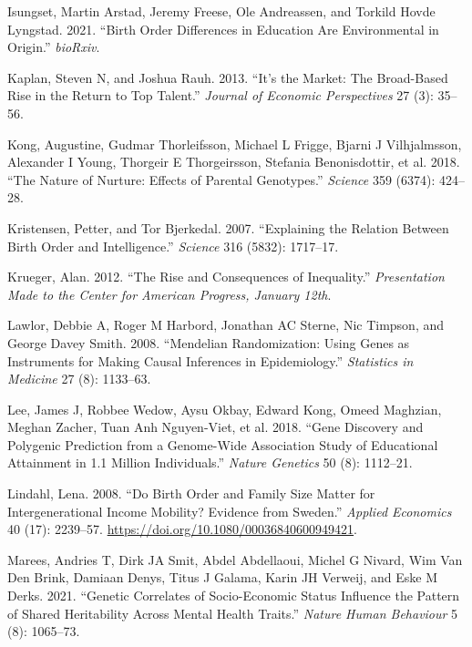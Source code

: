 \documentclass[
]{article}
\newlength{\cslhangindent}
\newlength{\cslentryspacingunit} %
\newenvironment{CSLReferences}[2] %
 {%
  \setlength{\parindent}{0pt}
  \ifodd #1
  \let\oldpar\par
  \def\par{\hangindent=\cslhangindent\oldpar}
  \fi
  \setlength{\parskip}{#2\cslentryspacingunit}
 }%
 {}
\theoremstyle{definition}
\theoremstyle{definition}
\theoremstyle{definition}
\theoremstyle{definition}
\theoremstyle{remark}
\begin{document}
\begin{CSLReferences}{1}{0}
\leavevmode{}%
Isungset, Martin Arstad, Jeremy Freese, Ole Andreassen, and Torkild Hovde Lyngstad. 2021. {``Birth Order Differences in Education Are Environmental in Origin.''} \emph{bioRxiv}.

\leavevmode{}%
Kaplan, Steven N, and Joshua Rauh. 2013. {``It's the Market: The Broad-Based Rise in the Return to Top Talent.''} \emph{Journal of Economic Perspectives} 27 (3): 35--56.

\leavevmode{}%
Kong, Augustine, Gudmar Thorleifsson, Michael L Frigge, Bjarni J Vilhjalmsson, Alexander I Young, Thorgeir E Thorgeirsson, Stefania Benonisdottir, et al. 2018. {``The Nature of Nurture: Effects of Parental Genotypes.''} \emph{Science} 359 (6374): 424--28.

\leavevmode{}%
Kristensen, Petter, and Tor Bjerkedal. 2007. {``Explaining the Relation Between Birth Order and Intelligence.''} \emph{Science} 316 (5832): 1717--17.

\leavevmode{}%
Krueger, Alan. 2012. {``The Rise and Consequences of Inequality.''} \emph{Presentation Made to the Center for American Progress, January 12th}.

\leavevmode{}%
Lawlor, Debbie A, Roger M Harbord, Jonathan AC Sterne, Nic Timpson, and George Davey Smith. 2008. {``Mendelian Randomization: Using Genes as Instruments for Making Causal Inferences in Epidemiology.''} \emph{Statistics in Medicine} 27 (8): 1133--63.

\leavevmode{}%
Lee, James J, Robbee Wedow, Aysu Okbay, Edward Kong, Omeed Maghzian, Meghan Zacher, Tuan Anh Nguyen-Viet, et al. 2018. {``Gene Discovery and Polygenic Prediction from a Genome-Wide Association Study of Educational Attainment in 1.1 Million Individuals.''} \emph{Nature Genetics} 50 (8): 1112--21.

\leavevmode{}%
Lindahl, Lena. 2008. {``Do Birth Order and Family Size Matter for Intergenerational Income Mobility? Evidence from Sweden.''} \emph{Applied Economics} 40 (17): 2239--57. \url{https://doi.org/10.1080/00036840600949421}.

\leavevmode{}%
Marees, Andries T, Dirk JA Smit, Abdel Abdellaoui, Michel G Nivard, Wim Van Den Brink, Damiaan Denys, Titus J Galama, Karin JH Verweij, and Eske M Derks. 2021. {``Genetic Correlates of Socio-Economic Status Influence the Pattern of Shared Heritability Across Mental Health Traits.''} \emph{Nature Human Behaviour} 5 (8): 1065--73.


\end{CSLReferences}
\end{document}
